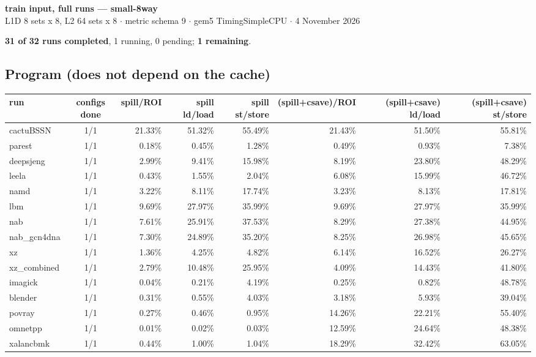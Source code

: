 \documentclass[10pt,a4paper,landscape]{article}
\begin{document}
\begin{center}
{\large\bfseries train input, full runs --- small-8way}\\[3pt]
{\small L1D 8 sets x 8, L2 64 sets x 8 $\cdot$ metric schema 9 $\cdot$ gem5 TimingSimpleCPU $\cdot$ 4 November 2026}
\end{center}
\textbf{31 of 32 runs completed}, 1 running, 0 pending; \textbf{1 remaining}.\par
\subsection*{Program (does not depend on the cache)}
{\footnotesize
\begin{longtable}{lcrrrrrr}
\toprule
run & configs done & spill/ROI & spill ld/load & spill st/store & (spill+csave)/ROI & (spill+csave) ld/load & (spill+csave) st/store \\
\midrule
\endhead
\bottomrule
\endfoot
cactuBSSN & 1/1 & 21.33\% & 51.32\% & 55.49\% & 21.43\% & 51.50\% & 55.81\% \\
parest & 1/1 & 0.18\% & 0.45\% & 1.28\% & 0.49\% & 0.93\% & 7.38\% \\
deepsjeng & 1/1 & 2.99\% & 9.41\% & 15.98\% & 8.19\% & 23.80\% & 48.29\% \\
leela & 1/1 & 0.43\% & 1.55\% & 2.04\% & 6.08\% & 15.99\% & 46.72\% \\
namd & 1/1 & 3.22\% & 8.11\% & 17.74\% & 3.23\% & 8.13\% & 17.81\% \\
lbm & 1/1 & 9.69\% & 27.97\% & 35.99\% & 9.69\% & 27.97\% & 35.99\% \\
nab & 1/1 & 7.61\% & 25.91\% & 37.53\% & 8.29\% & 27.38\% & 44.95\% \\
nab\_gcn4dna & 1/1 & 7.30\% & 24.89\% & 35.20\% & 8.25\% & 26.98\% & 45.65\% \\
xz & 1/1 & 1.36\% & 4.25\% & 4.82\% & 6.14\% & 16.52\% & 26.27\% \\
xz\_combined & 1/1 & 2.79\% & 10.48\% & 25.95\% & 4.09\% & 14.43\% & 41.80\% \\
imagick & 1/1 & 0.04\% & 0.21\% & 4.19\% & 0.25\% & 0.82\% & 48.78\% \\
blender & 1/1 & 0.31\% & 0.55\% & 4.03\% & 3.18\% & 5.93\% & 39.04\% \\
povray & 1/1 & 0.27\% & 0.46\% & 0.95\% & 14.26\% & 22.21\% & 55.40\% \\
omnetpp & 1/1 & 0.01\% & 0.02\% & 0.03\% & 12.59\% & 24.64\% & 48.38\% \\
xalancbmk & 1/1 & 0.44\% & 1.00\% & 1.04\% & 18.29\% & 32.42\% & 63.05\% \\

\end{longtable}}
\end{document}
